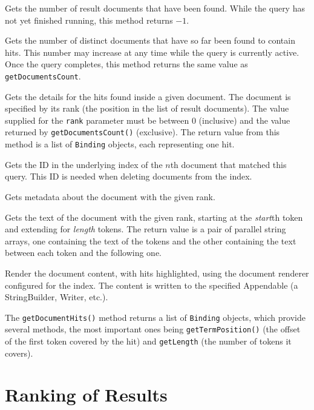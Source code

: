 \bde
\item[getDocumentsCount()] Gets the number of result documents that have been 
  found. While the query has not yet finished running, this method returns
  $-1$.
\item[getDocumentsCurrentCount()] Gets the number of distinct documents that
  have so far been found to contain hits. This number may increase at any time
  while the query is currently active. Once the query completes, this method
  returns the same value as {\tt getDocumentsCount}.
\item[getDocumentHits(rank)] Gets the details for the hits found inside a given
  document. The document is specified by its rank (the position in the list of
  result documents). The value supplied for the {\tt rank} parameter must be
  between $0$ (inclusive) and the value returned by {\tt getDocumentsCount()}
  (exclusive). The return value from this method is a list of {\tt Binding}
  objects, each representing one hit.
\item[getDocumentID(rank)] Gets the ID in the underlying index of the
  $n$th document that matched this query. This ID is needed when deleting
  documents from the index.
\item[getDocumentTitle/URI(rank)] Gets metadata about the document with the
  given rank.
\item[getDocumentText(rank, start, length)] Gets the text of the document with
  the given rank, starting at the {\em start}th token and extending for
  {\em length} tokens.  The return value is a pair of parallel string arrays,
  one containing the text of the tokens and the other containing the text
  between each token and the following one.
\item[renderDocument(rank, Appendable)] Render the document content, with hits
  highlighted, using the document renderer configured for the index.  The
  content is written to the specified Appendable (a StringBuilder, Writer,
  etc.).
\ede

The {\tt getDocumentHits()} method returns a list of {\tt Binding} objects,
which provide several methods, the most important ones being 
{\tt getTermPosition()} (the offset of the first token covered by the hit) and 
{\tt getLength} (the number of tokens it covers).

\section{Ranking of Results}
\label{sec:search:rank}

